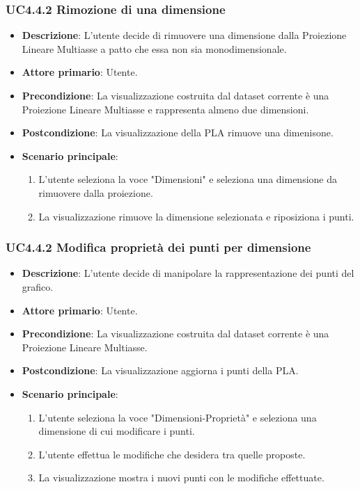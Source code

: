 \subsubsection{UC4.4.2 Rimozione di una dimensione}
\label{subsec:uc4.2.1}
\begin{itemize}
    \item \textbf{Descrizione}: L’utente decide di rimuovere una dimensione dalla Proiezione Lineare Multiasse
                                a patto che essa non sia monodimensionale.

    \item \textbf{Attore primario}: Utente.
    
    \item \textbf{Precondizione}:   La visualizzazione costruita dal dataset corrente è una Proiezione Lineare Multiasse
                                    e rappresenta almeno due dimensioni.
    \item \textbf{Postcondizione}:  La visualizzazione della PLA rimuove una dimenisone.

	\item \textbf{Scenario principale}:
        \begin{enumerate}
            \item L'utente seleziona la voce "Dimensioni" e seleziona una dimensione da rimuovere dalla proiezione.
            \item La visualizzazione rimuove la dimensione selezionata e riposiziona i punti.
           
        \end{enumerate}
\end{itemize}


\subsubsection{UC4.4.2 Modifica proprietà dei punti per dimensione}
\label{subsec:uc4.2.1}
\begin{itemize}
    \item \textbf{Descrizione}: L’utente decide di manipolare la rappresentazione dei punti del grafico.

    \item \textbf{Attore primario}: Utente.
    
    \item \textbf{Precondizione}:   La visualizzazione costruita dal dataset corrente è una Proiezione Lineare Multiasse.
    \item \textbf{Postcondizione}:  La visualizzazione aggiorna i punti della PLA.

	\item \textbf{Scenario principale}:
        \begin{enumerate}
            \item L'utente seleziona la voce "Dimensioni-Proprietà" e seleziona una dimensione di cui modificare i punti.
            \item L'utente effettua le modifiche che desidera tra quelle proposte.
            \item La visualizzazione mostra i nuovi punti con le modifiche effettuate.
        \end{enumerate}
\end{itemize}


